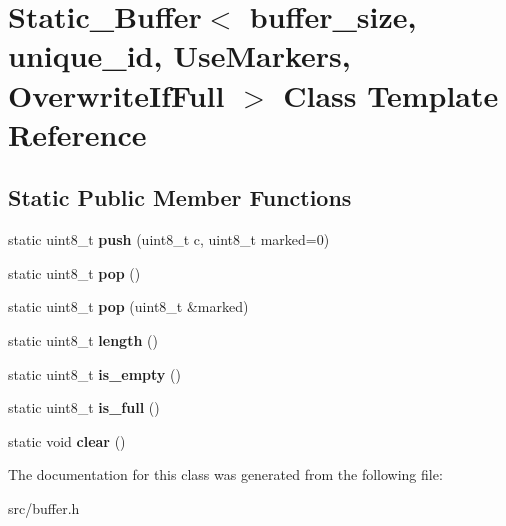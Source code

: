\hypertarget{classStatic__Buffer}{}\section{Static\+\_\+\+Buffer$<$ buffer\+\_\+size, unique\+\_\+id, Use\+Markers, Overwrite\+If\+Full $>$ Class Template Reference}
\label{classStatic__Buffer}
\subsection*{Static Public Member Functions}
\begin{DoxyCompactItemize}
\item 
\hypertarget{classStatic__Buffer_ac4c67ff57fef1ed15e10f52f5c932dfb}{}\label{classStatic__Buffer_ac4c67ff57fef1ed15e10f52f5c932dfb} 
static uint8\+\_\+t {\bfseries push} (uint8\+\_\+t c, uint8\+\_\+t marked=0)
\item 
\hypertarget{classStatic__Buffer_ad8c14c6521d6473431a3ee0ce1ca8870}{}\label{classStatic__Buffer_ad8c14c6521d6473431a3ee0ce1ca8870} 
static uint8\+\_\+t {\bfseries pop} ()
\item 
\hypertarget{classStatic__Buffer_a0a23b75e95db16858f25697bd52acb13}{}\label{classStatic__Buffer_a0a23b75e95db16858f25697bd52acb13} 
static uint8\+\_\+t {\bfseries pop} (uint8\+\_\+t \&marked)
\item 
\hypertarget{classStatic__Buffer_ad3748280942bfc275e52df95f310b0e8}{}\label{classStatic__Buffer_ad3748280942bfc275e52df95f310b0e8} 
static uint8\+\_\+t {\bfseries length} ()
\item 
\hypertarget{classStatic__Buffer_ae9f38e912e9d77fa18a675ac6e22765f}{}\label{classStatic__Buffer_ae9f38e912e9d77fa18a675ac6e22765f} 
static uint8\+\_\+t {\bfseries is\+\_\+empty} ()
\item 
\hypertarget{classStatic__Buffer_ae5a31c4d47525f127870478f2cf937f8}{}\label{classStatic__Buffer_ae5a31c4d47525f127870478f2cf937f8} 
static uint8\+\_\+t {\bfseries is\+\_\+full} ()
\item 
\hypertarget{classStatic__Buffer_abfb1a89519c9f90fb7490cebbf028304}{}\label{classStatic__Buffer_abfb1a89519c9f90fb7490cebbf028304} 
static void {\bfseries clear} ()
\end{DoxyCompactItemize}


The documentation for this class was generated from the following file\+:\begin{DoxyCompactItemize}
\item 
src/buffer.\+h\end{DoxyCompactItemize}
